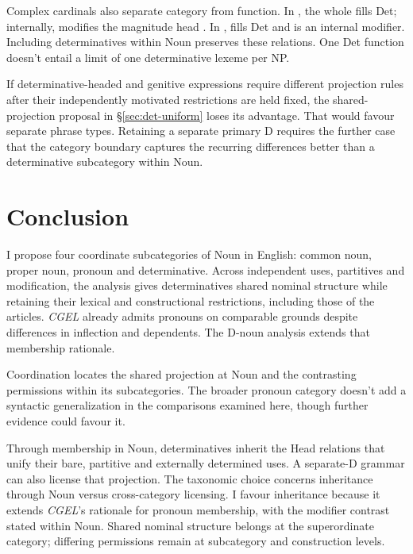 \documentclass[12pt]{article}
\begin{document}
Complex cardinals also separate category from function. In , the whole  fills Det; internally,  modifies the magnitude head  \citep[§4]{reynolds2026numerals}. In ,  fills Det and  is an internal modifier. Including determinatives within Noun preserves these relations. One Det function doesn't entail a limit of one determinative lexeme per NP.

If determinative-headed and genitive expressions require different projection rules after their independently motivated restrictions are held fixed, the shared-projection proposal in §\ref{sec:det-uniform} loses its advantage. That would favour separate phrase types. Retaining a separate primary D requires the further case that the category boundary captures the recurring differences better than a determinative subcategory within Noun.

\section{Conclusion}\label{sec:conclusion}

I propose four coordinate subcategories of Noun in English: common noun, proper noun, pronoun and determinative. Across independent uses, partitives and modification, the analysis gives determinatives shared nominal structure while retaining their lexical and constructional restrictions, including those of the articles. \textit{CGEL} already admits pronouns on comparable grounds despite differences in inflection and dependents. The D-noun analysis extends that membership rationale.

Coordination locates the shared projection at Noun and the contrasting permissions within its subcategories. The broader pronoun category doesn't add a syntactic generalization in the comparisons examined here, though further evidence could favour it.

Through membership in Noun, determinatives inherit the Head relations that unify their bare, partitive and externally determined uses. A separate-D grammar can also license that projection. The taxonomic choice concerns inheritance through Noun versus cross-category licensing. I favour inheritance because it extends \textit{CGEL}'s rationale for pronoun membership, with the modifier contrast stated within Noun. Shared nominal structure belongs at the superordinate category; differing permissions remain at subcategory and construction levels.
\end{document}
